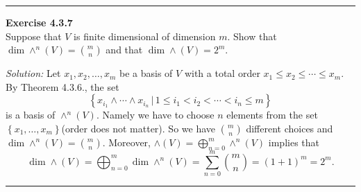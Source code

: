 \documentclass[a4paper, 12pt]{article}
\newenvironment{problem}[2][Exercise]
    { \begin{mdframed}[backgroundcolor=gray!20] \textbf{#1 #2} \\}
    {  \end{mdframed}}
\newenvironment{solution}
    {\textit{Solution:}}
    {}
\begin{document}
\noindent\rule{7in}{2.8pt}
\begin{problem}{4.3.7}
Suppose that \(V\) is finite dimensional of dimension \(m\). Show that \(\dim \wedge^n(V)=\binom{m}{n}\) and that \(\dim \wedge(V)=2^m\).	
\end{problem}
\begin{solution}
Let \(x_1,x_2,\ldots,x_m\) be a basis of \(V\) with a total order \(x_1\leq x_2\leq \cdots\leq x_m\). By Theorem 4.3.6., the set 
\[\left\{ x_{i_1}\wedge \cdots\wedge x_{i_n}\,|\, 1\leq i_1<i_2<\cdots<i_n\leq m \right\}\]
is a basis of \(\wedge^n(V)\). Namely we have to choose \(n\) elements from the set \(\left\{ x_1,\ldots, x_m \right\}\)(order does not matter). So we have \(\binom{m}{n}\) different choices and \(\dim \wedge^n(V)=\binom{m}{n}\). 
Moreover, \(\wedge(V)=\bigoplus_{n=0}^m \wedge^n(V)\) implies that 
\[\dim \wedge(V)=\bigoplus_{n=0}^m \dim \wedge^n(V)=\sum_{n=0}^{m}\binom{m}{n}=(1+1)^m=2^m.\]
\end{solution}

\noindent\rule{7in}{2.8pt}
\end{document}
